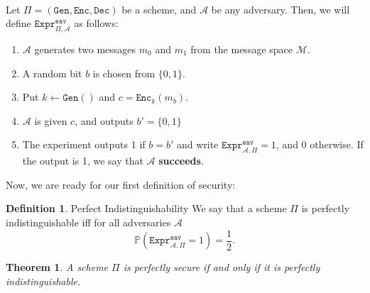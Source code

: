 \documentclass{article}
\newtheorem{theorem}{Theorem}[section]
\theoremstyle{definition}
\newtheorem{definition}{Definition}[section]
\theoremstyle{example}
\newcommand{\Enc}{\texttt{Enc}}
\newcommand{\Dec}{\texttt{Dec}}
\newcommand{\Gen}{\texttt{Gen}}
\newcommand{\M}{\mathcal{M}}
\newcommand{\A}{\mathcal{A}}
\newcommand{\Prob}{\mathbb{P}}
\newcommand{\Expr}[2]{\texttt{Expr}^{\texttt{#1}}_{#2}}
\begin{document}
\paragraph{}
Let $\Pi = (\Gen, \Enc, \Dec)$ be a scheme, and $\A$ be any adversary.
Then, we will define $\texttt{Expr}^{\texttt{eav}}_{\Pi, \A}$ as
follows:
\begin{enumerate}
\item $\A$ generates two messages $m_0$ and $m_1$ from the message space $\M$.
\item A random bit $b$ is chosen from $\{0, 1\}$.
\item Put $k \leftarrow \Gen()$ and $c = \Enc_k(m_b)$.
\item $\A$ is given $c$, and outputs $b'= \{0, 1\}$
\item The experiment outputs 1 if $b = b'$ and write $\Expr{eav}{\A, \Pi} = 1$,
  and 0 otherwise. If the output is 1, we say that $\A$ \textbf{succeeds}.
\end{enumerate}
Now, we are ready for our first definition of security:
\begin{definition}{Perfect Indistinguishability}
  \label{def:perfect_indistinguishability}
We say that a scheme $\Pi$ is perfectly indistinguishable iff for all adversaries $\A$
\[
  \Prob(\Expr{eav}{\A, \Pi} = 1) = \frac12.
\]
\end{definition}
\begin{theorem}
  \label{thm:perfect_equivalence}
A scheme $\Pi$ is perfectly secure if and only if it is perfectly indistinguishable.
\end{theorem}
\end{document}
